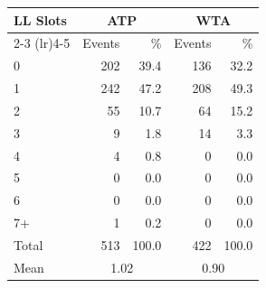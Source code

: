 \begin{tabular}{l rr rr}
\toprule
LL Slots & \multicolumn{2}{c}{ATP} & \multicolumn{2}{c}{WTA} \\
\cmidrule(lr){2-3}
\cmidrule(lr){4-5}
 & Events & \% & Events & \% \\
\midrule
0 & 202 & 39.4 & 136 & 32.2 \\
1 & 242 & 47.2 & 208 & 49.3 \\
2 & 55 & 10.7 & 64 & 15.2 \\
3 & 9 & 1.8 & 14 & 3.3 \\
4 & 4 & 0.8 & 0 & 0.0 \\
5 & 0 & 0.0 & 0 & 0.0 \\
6 & 0 & 0.0 & 0 & 0.0 \\
7+ & 1 & 0.2 & 0 & 0.0 \\
\midrule
Total & 513 & 100.0 & 422 & 100.0 \\
Mean & \multicolumn{2}{c}{1.02} & \multicolumn{2}{c}{0.90} \\
\bottomrule
\end{tabular}
